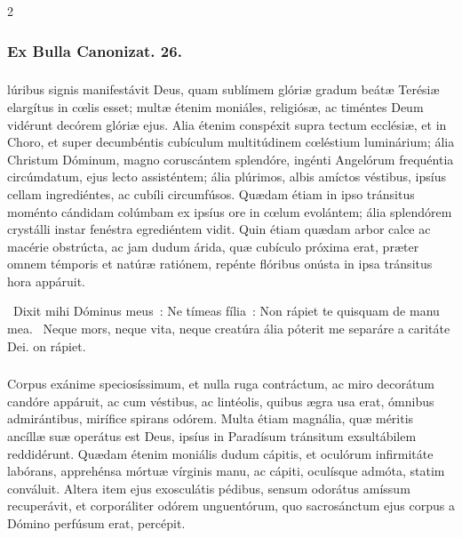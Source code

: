 \documentclass[9pt,twoside]{extarticle}
\begin{document}
\begin{multicols}{2}
{{\subsubsection*{\center Ex Bulla Canonizat. 26.}
\subsubsection*{\center {}}
lúribus signis manifestávit Deus, quam sublímem glóriæ gradum beátæ Terésiæ elargítus in cœlis esset; multæ étenim moniáles, religiósæ, ac timéntes Deum vidérunt decórem glóriæ ejus. Alia étenim conspéxit supra tectum ecclésiæ, et in Choro, et super decumbéntis cubículum multitúdinem cœléstium luminárium; ália Christum Dóminum, magno coruscántem splendóre, ingénti Angelórum frequéntia circúmdatum, ejus lecto assisténtem; ália plúrimos, albis amíctos véstibus, ipsíus cellam ingrediéntes, ac cubíli circumfúsos. Quædam étiam in ipso tránsitus moménto cándidam colúmbam ex ipsíus ore in cœlum evolántem; ália splendórem crystálli instar fenéstra egrediéntem vidit. Quin étiam quædam arbor calce ac macérie obstrúcta, ac jam dudum árida, quæ cubículo próxima erat, præter omnem témporis et natúræ ratiónem, repénte flóribus onústa in ipsa tránsitus hora appáruit.

\begin{tightlist}{}
\item {}~Dixit mihi Dóminus meus~: Ne tímeas fília~: \textred{*} Non rápiet te quisquam de manu mea. ~Neque mors, neque vita, neque creatúra ália póterit me separáre a caritáte Dei. on rápiet.
\end{tightlist}

\subsubsection*{\center {}}
\lettrine{C}orpus exánime speciosíssimum, et nulla ruga contráctum, ac miro decorátum candóre appáruit, ac cum véstibus, ac lintéolis, quibus ægra usa erat, ómnibus admirántibus, mirífice spirans odórem. Multa étiam magnália, quæ méritis ancíllæ suæ operátus est Deus, ipsíus in Paradísum tránsitum exsultábilem reddidérunt. Quædam étenim moniális dudum cápitis, et oculórum infirmitáte labórans, apprehénsa mórtuæ vírginis manu, ac cápiti, oculísque admóta, statim conváluit. Altera item ejus exosculátis pédibus, sensum odorátus amíssum recuperávit, et corporáliter odórem unguentórum, quo sacrosánctum ejus corpus a Dómino perfúsum erat, percépit.

}}
\end{multicols}
\end{document}
